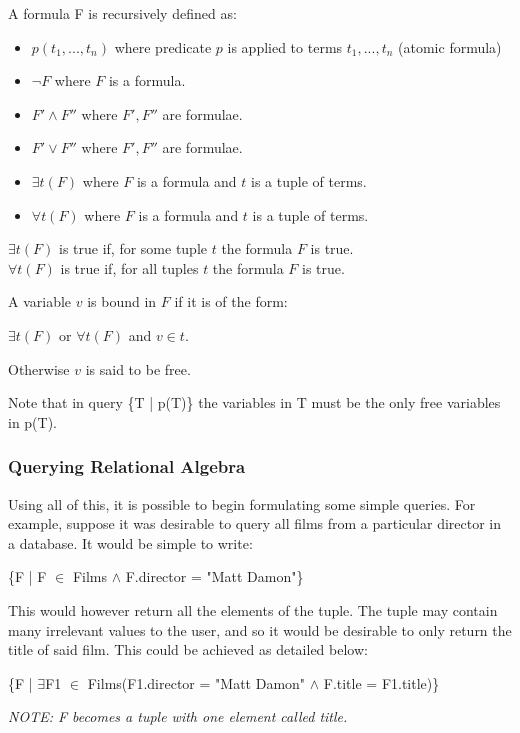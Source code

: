 \documentclass[a4paper, 11pt]{article}
\begin{document}
    A formula F is recursively defined as:
    \begin{itemize}
      \item $p(t_1, ..., t_n)$ where predicate $p$ is applied to terms $t_1, ..., t_n$ (atomic formula)
        \item $\lnot F$ where $F$ is a formula.
        \item $F' \land F''$ where $F', F''$ are formulae.
        \item $F' \lor F''$ where $F', F''$ are formulae.
        \item $\exists t(F)$ where $F$ is a formula and $t$ is a tuple of terms.
        \item $\forall t(F)$ where $F$ is a formula and $t$ is a tuple of terms.
      \end{itemize}

      $\exists t(F)$ is true if, for some tuple $t$ the formula $F$ is true. \\
      $\forall t(F)$ is true if, for all tuples $t$ the formula $F$ is true.

      A variable $v$ is bound in $F$ if it is of the form:

      $\exists t(F)$ or $\forall t(F)$ and $v \in t$.

      Otherwise $v$ is said to be free.
      
      Note that in query \{T | p(T)\} the variables in T must be the only
      free variables in p(T).

    \subsubsection{Querying Relational Algebra}
      Using all of this, it is possible to begin formulating some simple
      queries. For example, suppose it was desirable to query all films from a
      particular director in a database. It would be simple to write:

      \begin{center}
        \{F | F $\in$ Films $\land$ F.director = "Matt Damon"\}
      \end{center}

      This would however return all the elements of the tuple. The tuple may
      contain many irrelevant values to the user, and so it would be desirable
      to only return the title of said film. This could be achieved as detailed
      below:

      \begin{center}
        \{F | $\exists$F1 $\in$ Films(F1.director = "Matt Damon" $\land$ 
          F.title = F1.title)\}
      
        \emph{NOTE: F becomes a tuple with one element called title.}
      \end{center}
\end{document}

